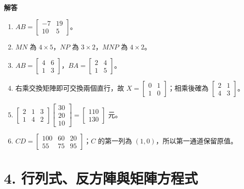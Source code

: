 \documentclass[11pt,a4paper]{article}
\providecommand{\tightlist}{%
  \setlength{\itemsep}{0pt}\setlength{\parskip}{0pt}}
\begin{document}
\begin{HandoutSelfCheck}
\textbf{解答}

\begin{enumerate}
\def\labelenumi{\arabic{enumi}.}
\tightlist
\item
  \(\boxed{AB=\begin{bmatrix}-7&19\\10&5\end{bmatrix}}\)。
\item
  \(MN\) 為 \(\boxed{4\times5}\)，\(NP\) 為 \(\boxed{3\times2}\)，\(MNP\) 為 \(\boxed{4\times2}\)。
\item
  \(\boxed{AB=\begin{bmatrix}4&6\\1&3\end{bmatrix}}\)，\(\boxed{BA=\begin{bmatrix}2&4\\1&5\end{bmatrix}}\)。
\item
  右乘交換矩陣即可交換兩個直行，故 \(\boxed{X=\begin{bmatrix}0&1\\1&0\end{bmatrix}}\)；相乘後確為 \(\begin{bmatrix}2&1\\4&3\end{bmatrix}\)。
\item
  \(\begin{bmatrix}2&1&3\\1&4&2\end{bmatrix}\begin{bmatrix}30\\20\\10\end{bmatrix}=\boxed{\begin{bmatrix}110\\130\end{bmatrix}}\) 元。
\item
  \(\boxed{CD=\begin{bmatrix}100&60&20\\55&75&95\end{bmatrix}}\)；\(C\) 的第一列為 \((1,0)\)，所以第一通道保留原值。
\end{enumerate}

\end{HandoutSelfCheck}

\section{4. 行列式、反方陣與矩陣方程式}\label{ux884cux5217ux5f0fux53cdux65b9ux9663ux8207ux77e9ux9663ux65b9ux7a0bux5f0f}
\end{document}

